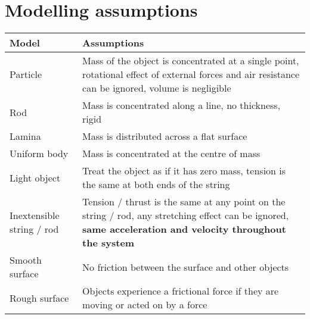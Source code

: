 \section{Modelling assumptions}
\begin{tabular}{|m{3.9cm} | m{13.5cm}|}
    \hline
    \textbf{Model}            & \textbf{Assumptions}                                                                                                                                                                                    \\
    \hline
    Particle                  & Mass of the object is concentrated at a single point, rotational effect of external forces and air resistance can be ignored, volume is negligible                                                      \\
    \hline
    Rod                       & Mass is concentrated along a line, no thickness, rigid                                                                                                                                                  \\
    \hline
    Lamina                    & Mass is distributed across a flat surface                                                                                                                                                               \\
    \hline
    Uniform body              & Mass is concentrated at the centre of mass                                                                                                                                                              \\
    \hline
    Light object              & Treat the object as if it has zero mass, tension is the same at both ends of the string                                                                                                                 \\
    \hline
    Inextensible string / rod & Tension / thrust is the same at any point on the string / rod, any stretching effect can be ignored, \textbf{same acceleration and velocity throughout the system}                                      \\
    \hline
    Smooth surface            & No friction between the surface and other objects                                                                                                                                                       \\
    \hline
    Rough surface             & Objects experience a frictional force if they are moving or acted on by a force                                                                                                                         \\

\end{tabular}
